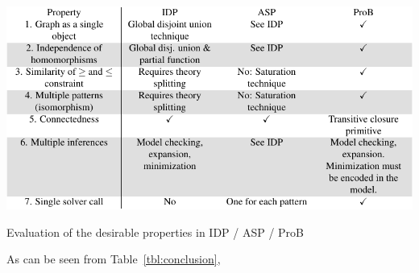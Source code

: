 \begin{table}[h]
\begin{center}
\includegraphics{PropertyTable-crop.pdf}
\end{center}
\caption{Evaluation of the desirable properties in IDP / ASP / ProB\label{tbl:conclusion}}
\end{table}

As can be seen from Table~\ref{tbl:conclusion}, 

